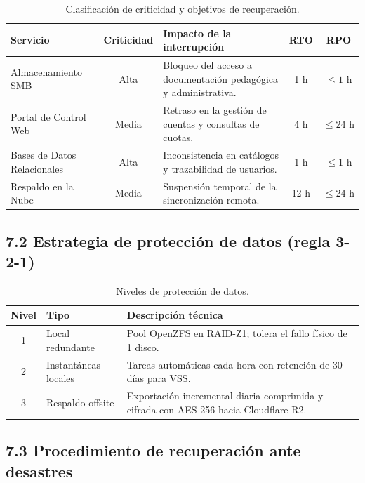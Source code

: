 \documentclass[10pt,a4paper]{article}
\begin{document}
\begin{table}[htbp]
\centering
\small
\caption{Clasificación de criticidad y objetivos de recuperación.}
\label{tab:bia}
\begin{tabular}{|p{4cm}|c|p{6.5cm}|c|c|}
\hline
\textbf{\textsf{Servicio}} & \textbf{\textsf{Criticidad}} & \textbf{\textsf{Impacto de la interrupción}} & \textbf{\textsf{RTO}} & \textbf{\textsf{RPO}} \\
\hline
Almacenamiento SMB & Alta & Bloqueo del acceso a documentación pedagógica y administrativa. & 1 h & $\le 1\text{ h}$ \\
\hline
Portal de Control Web & Media & Retraso en la gestión de cuentas y consultas de cuotas. & 4 h & $\le 24\text{ h}$ \\
\hline
Bases de Datos Relacionales & Alta & Inconsistencia en catálogos y trazabilidad de usuarios. & 1 h & $\le 1\text{ h}$ \\
\hline
Respaldo en la Nube & Media & Suspensión temporal de la sincronización remota. & 12 h & $\le 24\text{ h}$ \\
\hline
\end{tabular}
\end{table}

\subsection{7.2 Estrategia de protección de datos (regla 3-2-1)}

\begin{table}[htbp]
\centering
\small
\caption{Niveles de protección de datos.}
\label{tab:321}
\begin{tabular}{|c|p{4cm}|p{9.8cm}|}
\hline
\textbf{\textsf{Nivel}} & \textbf{\textsf{Tipo}} & \textbf{\textsf{Descripción técnica}} \\
\hline
1 & Local redundante & Pool OpenZFS en RAID-Z1; tolera el fallo físico de 1 disco. \\
\hline
2 & Instantáneas locales & Tareas automáticas cada hora con retención de 30 días para VSS. \\
\hline
3 & Respaldo offsite & Exportación incremental diaria comprimida y cifrada con AES-256 hacia Cloudflare R2. \\
\hline
\end{tabular}
\end{table}

\subsection{7.3 Procedimiento de recuperación ante desastres}
\end{document}
